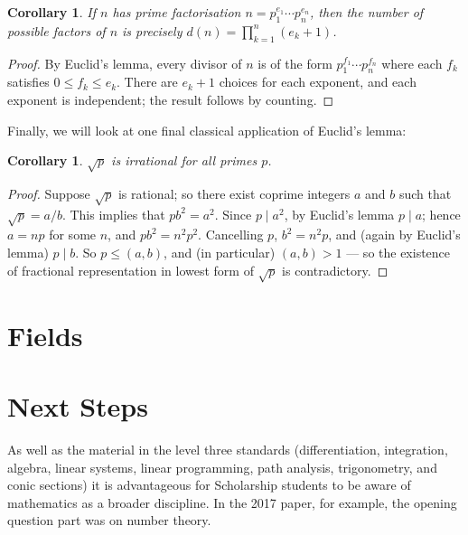\documentclass[a4paper,leqno]{article}
\numberwithin{equation}{section}
\newtheorem{cor}[equation]{Corollary}
\theoremstyle{definition}
\theoremstyle{remark}
\begin{document}
\begin{cor}
  If $ n $ has prime factorisation $ n = p_1^{e_1} \cdots p_n^{e_n} $, then the number of possible factors of $ n $ is precisely $ d(n) = \prod_{k = 1}^n (e_k + 1) $.
\end{cor}
\begin{proof}
  By Euclid's lemma, every divisor of $ n $ is of the form $ p_1^{f_1} \cdots p_n^{f_n} $ where each $ f_k $ satisfies $ 0 \leq f_k \leq e_k $. There
  are $ e_k + 1 $ choices for each exponent, and each exponent is independent; the result follows by counting.
\end{proof}

Finally, we will look at one final classical application of Euclid's lemma:
\begin{cor}
  $ \sqrt{p} $ is irrational for all primes $ p $.
\end{cor}
\begin{proof}
  Suppose $ \sqrt{p} $ is rational; so there exist coprime integers $ a $ and $ b $ such that $ \sqrt{p} = a/b $. This implies
  that $ pb^2 = a^2 $. Since $ p \mid a^2 $, by Euclid's lemma $ p \mid a $; hence $ a = np $ for some $ n $, and $ pb^2 = n^2 p^2 $.
  Cancelling $ p $, $ b^2 = n^2 p $, and (again by Euclid's lemma) $ p \mid b $. So $ p \leq (a,b) $, and (in particular) $ (a,b) > 1 $ ---
  so the existence of fractional representation in lowest form of $ \sqrt{p} $ is contradictory.
\end{proof}

\section{Fields}

\section{Next Steps}
As well as the material in the level three standards (differentiation, integration, algebra, linear systems, linear programming, path analysis,
trigonometry, and conic sections) it is advantageous for Scholarship students to be aware of mathematics as a broader discipline. In the 2017
paper, for example, the opening question part was on number theory.
\end{document}
